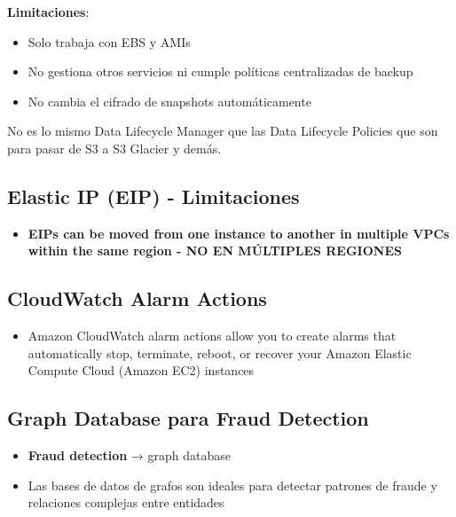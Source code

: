 \documentclass[12pt,a4paper]{report}
\newcommand{\important}[1]{\textcolor{dangerred}{\textbf{#1}}}
\begin{document}
\textbf{Limitaciones}:
\begin{itemize}
    \item Solo trabaja con EBS y AMIs
    \item No gestiona otros servicios ni cumple políticas centralizadas de backup
    \item No cambia el cifrado de snapshots automáticamente
\end{itemize}

\begin{warningbox}[Importante]
No es lo mismo Data Lifecycle Manager que las Data Lifecycle Policies que son para pasar de S3 a S3 Glacier y demás.
\end{warningbox}

\subsection{Elastic IP (EIP) - Limitaciones}

\begin{itemize}
    \item \important{EIPs can be moved from one instance to another in multiple VPCs within the same region - NO EN MÚLTIPLES REGIONES}
\end{itemize}

\subsection{CloudWatch Alarm Actions}

\begin{itemize}
    \item Amazon CloudWatch alarm actions allow you to create alarms that automatically stop, terminate, reboot, or recover your Amazon Elastic Compute Cloud (Amazon EC2) instances
\end{itemize}

\subsection{Graph Database para Fraud Detection}

\begin{itemize}
    \item \textbf{Fraud detection} → graph database
    \item Las bases de datos de grafos son ideales para detectar patrones de fraude y relaciones complejas entre entidades
\end{itemize}
\end{document}
